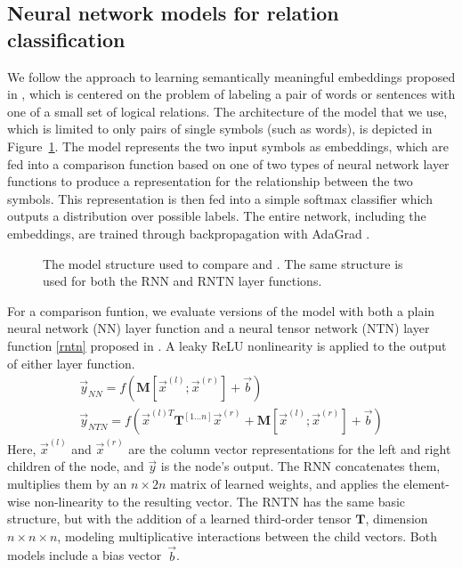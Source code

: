 
\subsection*{Neural network models for relation classification} \label{methods}


We follow the approach to learning semantically meaningful embeddings 
proposed in \citet{bowman2013can}, which is centered on the problem of
labeling a pair of words or sentences with one of a small set of logical
relations. The architecture of the model that we use, which is limited
to only pairs of single symbols (such as words), is depicted in
Figure~\ref{sample-figure}. The model represents the two input symbols
as embeddings, which are fed into a comparison function based on one
of two types of neural network layer functions to produce a representation
for the relationship between the two symbols. This representation is then
fed into a simple softmax classifier which outputs a distribution over
possible labels. The entire network, including the embeddings, are trained
through backpropagation with AdaGrad \cite{duchi2011adaptive}.

\begin{figure}[tp]
  \centering
  
  \caption{The model structure used to compare  and . 
    The same structure is used for both the RNN and RNTN layer functions.} 
  \label{sample-figure}
\end{figure}

For a comparison funtion, we evaluate versions of the model with both a plain neural
network (NN) layer function and a neural tensor network (NTN) layer function
\eqref{rntn} proposed in \citet{chen2013learning}. A leaky ReLU
nonlinearity \cite{maasrectifier} is applied to the output of either
layer function.
%
\begin{gather} \label{rnn}
\vec{y}_{\textit{NN}} = f(\mathbf{M} [\vec{x}^{(l)}; \vec{x}^{(r)}] + \vec{b}) \\ %
\label{rntn}
\vec{y}_{\textit{NTN}} = f(\vec{x}^{(l)T} \mathbf{T}^{[1 \ldots n]} \vec{x}^{(r)} + \mathbf{M} [\vec{x}^{(l)}; \vec{x}^{(r)}] + \vec{b})
\end{gather} 
%
Here, $\vec{x}^{(l)}$ and $\vec{x}^{(r)}$ are the column vector
representations for the left and right children of the node, and
$\vec{y}$ is the node's output.  The RNN concatenates them, multiplies
them by an $n \times 2n$ matrix of learned weights, and applies the
element-wise non-linearity to the resulting vector. The RNTN has the
same basic structure, but with the addition of a learned third-order
tensor $\mathbf{T}$, dimension $n \times n \times n$, modeling
multiplicative interactions between the child vectors. Both models
include a bias vector~$\vec{b}$.


